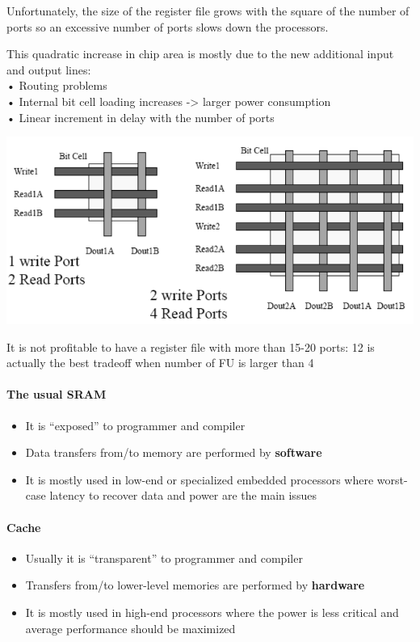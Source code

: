 Unfortunately, the size of the register file grows with the square of the number of ports so an excessive number of ports slows down the processors.

This quadratic increase in chip area is mostly due to the new additional input and output lines:\\
• Routing problems\\
• Internal bit cell loading increases -> larger power consumption\\
• Linear increment in delay with the number of ports

\includegraphics[width=.7\textwidth]{images/memory_bit_cells.png}

It is not profitable to have a register file with more than 15-20 ports: 12 is actually the best tradeoff when number of FU is larger than 4

\paragraph{The usual SRAM}
\begin{itemize}
    \item It is “exposed” to programmer and compiler
    \item Data transfers from/to memory are performed by \textbf{software}
    \item It is mostly used in low-end or specialized embedded processors where worst-case latency to recover data and power are the main issues
\end{itemize}

\paragraph{Cache}
\begin{itemize}
    \item Usually it is “transparent” to programmer and compiler
    \item Transfers from/to lower-level memories are performed by \textbf{hardware}
    \item It is mostly used in high-end processors where the power is less critical and average performance should be maximized
\end{itemize}

